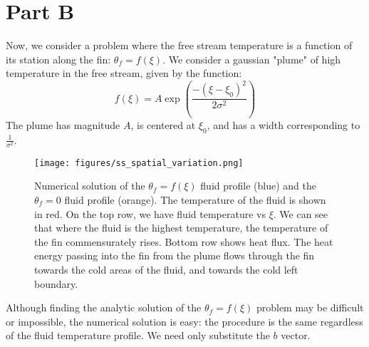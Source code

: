 \documentclass[10pt,letterpaper,notitlepage]{article}
\begin{document}
    \section{Part B}
    Now, we consider a problem where the free stream temperature is a function of its station along the fin: $\theta_f = f(\xi)$. We consider a gaussian "plume" of high temperature in the free stream, given by the function:
    \begin{equation}
        f(\xi) = A \exp{\left( \frac{-(\xi - \xi_0)^2}{2 \sigma^2} \right)}
    \end{equation}
    The plume has magnitude $A$, is centered at $\xi_0$, and has a width corresponding to $\frac{1}{\sigma ^2}$.
    \begin{figure}
        \centering
        \texttt{[image: figures/ss\_spatial\_variation.png]}
        \caption[Spatially varying temperature, heat flux distribution]{Numerical solution of the $\theta_f = f(\xi)$ fluid profile (blue) and the $\theta_f = 0$ fluid profile (orange). The temperature of the fluid is shown in red. On the top row, we have fluid temperature vs $\xi$. We can see that where the fluid is the highest temperature, the temperature of the fin commensurately rises. Bottom row shows heat flux. The heat energy passing into the fin from the plume flows through the fin towards the cold areas of the fluid, and towards the cold left boundary.}
        \label{fig:plume}
    \end{figure}
    Although finding the analytic solution of the $\theta_f=f(\xi)$ problem may be difficult or impossible, the numerical solution is easy: the procedure is the same regardless of the fluid temperature profile. We need only substitute the $b$ vector.
\end{document}
